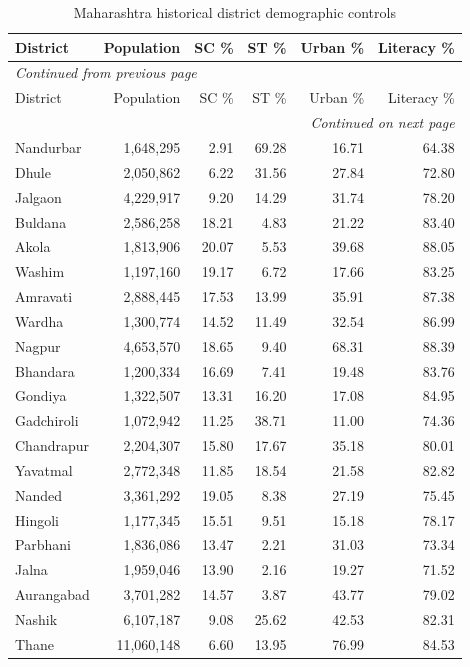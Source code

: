 \documentclass[11pt,a4paper]{report}
\begin{document}
\begin{longtable}{lrrrrr}
\caption{Maharashtra historical district demographic controls}\\\toprule
District & Population & SC \% & ST \% & Urban \% & Literacy \% \\\midrule\endfirsthead
\multicolumn{6}{l}{\textit{Continued from previous page}}\\\toprule
District & Population & SC \% & ST \% & Urban \% & Literacy \% \\\midrule\endhead
\midrule\multicolumn{6}{r}{\textit{Continued on next page}}\\\endfoot\bottomrule\endlastfoot
Nandurbar & 1,648,295 & 2.91 & 69.28 & 16.71 & 64.38 \\
Dhule & 2,050,862 & 6.22 & 31.56 & 27.84 & 72.80 \\
Jalgaon & 4,229,917 & 9.20 & 14.29 & 31.74 & 78.20 \\
Buldana & 2,586,258 & 18.21 & 4.83 & 21.22 & 83.40 \\
Akola & 1,813,906 & 20.07 & 5.53 & 39.68 & 88.05 \\
Washim & 1,197,160 & 19.17 & 6.72 & 17.66 & 83.25 \\
Amravati & 2,888,445 & 17.53 & 13.99 & 35.91 & 87.38 \\
Wardha & 1,300,774 & 14.52 & 11.49 & 32.54 & 86.99 \\
Nagpur & 4,653,570 & 18.65 & 9.40 & 68.31 & 88.39 \\
Bhandara & 1,200,334 & 16.69 & 7.41 & 19.48 & 83.76 \\
Gondiya & 1,322,507 & 13.31 & 16.20 & 17.08 & 84.95 \\
Gadchiroli & 1,072,942 & 11.25 & 38.71 & 11.00 & 74.36 \\
Chandrapur & 2,204,307 & 15.80 & 17.67 & 35.18 & 80.01 \\
Yavatmal & 2,772,348 & 11.85 & 18.54 & 21.58 & 82.82 \\
Nanded & 3,361,292 & 19.05 & 8.38 & 27.19 & 75.45 \\
Hingoli & 1,177,345 & 15.51 & 9.51 & 15.18 & 78.17 \\
Parbhani & 1,836,086 & 13.47 & 2.21 & 31.03 & 73.34 \\
Jalna & 1,959,046 & 13.90 & 2.16 & 19.27 & 71.52 \\
Aurangabad & 3,701,282 & 14.57 & 3.87 & 43.77 & 79.02 \\
Nashik & 6,107,187 & 9.08 & 25.62 & 42.53 & 82.31 \\
Thane & 11,060,148 & 6.60 & 13.95 & 76.99 & 84.53 \\

\end{longtable}
\end{document}
